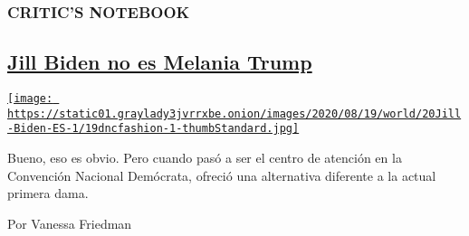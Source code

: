 \begin{enumerate}
\begin{enumerate}
    \hypertarget{critics-notebook}{%
    \subsubsection{CRITIC'S NOTEBOOK}\label{critics-notebook}}

    \hypertarget{jill-biden-no-es-melania-trump}{%
    \subsection{\texorpdfstring{\href{/es/2020/08/20/espanol/estilos-de-vida/jill-biden-melania-trump.html}{Jill
    Biden no es Melania
    Trump}}{Jill Biden no es Melania Trump}}\label{jill-biden-no-es-melania-trump}}

    \href{/es/2020/08/20/espanol/estilos-de-vida/jill-biden-melania-trump.html}{\texttt{[image: https://static01.graylady3jvrrxbe.onion/images/2020/08/19/world/20Jill-Biden-ES-1/19dncfashion-1-thumbStandard.jpg]}}

    Bueno, eso es obvio. Pero cuando pasó a ser el centro de atención en
    la Convención Nacional Demócrata, ofreció una alternativa diferente
    a la actual primera dama.

    Por Vanessa Friedman
  \end{enumerate}
\end{enumerate}

